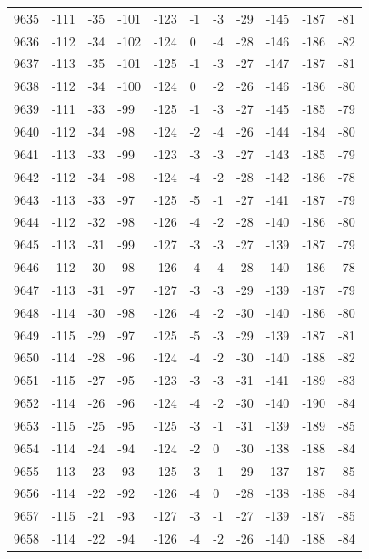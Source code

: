\begin{table}[H]
\begin{tabular}{lllllllllll}
9635 & -111 & -35 & -101 & -123 & -1 & -3 & -29 & -145 & -187 & -81 \\
9636 & -112 & -34 & -102 & -124 & 0 & -4 & -28 & -146 & -186 & -82 \\
9637 & -113 & -35 & -101 & -125 & -1 & -3 & -27 & -147 & -187 & -81 \\
9638 & -112 & -34 & -100 & -124 & 0 & -2 & -26 & -146 & -186 & -80 \\
9639 & -111 & -33 & -99 & -125 & -1 & -3 & -27 & -145 & -185 & -79 \\
9640 & -112 & -34 & -98 & -124 & -2 & -4 & -26 & -144 & -184 & -80 \\
9641 & -113 & -33 & -99 & -123 & -3 & -3 & -27 & -143 & -185 & -79 \\
9642 & -112 & -34 & -98 & -124 & -4 & -2 & -28 & -142 & -186 & -78 \\
9643 & -113 & -33 & -97 & -125 & -5 & -1 & -27 & -141 & -187 & -79 \\
9644 & -112 & -32 & -98 & -126 & -4 & -2 & -28 & -140 & -186 & -80 \\
9645 & -113 & -31 & -99 & -127 & -3 & -3 & -27 & -139 & -187 & -79 \\
9646 & -112 & -30 & -98 & -126 & -4 & -4 & -28 & -140 & -186 & -78 \\
9647 & -113 & -31 & -97 & -127 & -3 & -3 & -29 & -139 & -187 & -79 \\
9648 & -114 & -30 & -98 & -126 & -4 & -2 & -30 & -140 & -186 & -80 \\
9649 & -115 & -29 & -97 & -125 & -5 & -3 & -29 & -139 & -187 & -81 \\
9650 & -114 & -28 & -96 & -124 & -4 & -2 & -30 & -140 & -188 & -82 \\
9651 & -115 & -27 & -95 & -123 & -3 & -3 & -31 & -141 & -189 & -83 \\
9652 & -114 & -26 & -96 & -124 & -4 & -2 & -30 & -140 & -190 & -84 \\
9653 & -115 & -25 & -95 & -125 & -3 & -1 & -31 & -139 & -189 & -85 \\
9654 & -114 & -24 & -94 & -124 & -2 & 0 & -30 & -138 & -188 & -84 \\
9655 & -113 & -23 & -93 & -125 & -3 & -1 & -29 & -137 & -187 & -85 \\
9656 & -114 & -22 & -92 & -126 & -4 & 0 & -28 & -138 & -188 & -84 \\
9657 & -115 & -21 & -93 & -127 & -3 & -1 & -27 & -139 & -187 & -85 \\
9658 & -114 & -22 & -94 & -126 & -4 & -2 & -26 & -140 & -188 & -84 \\

\end{tabular}
\end{table}
